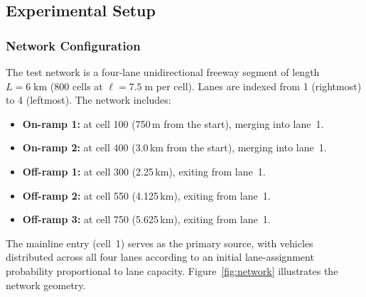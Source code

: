 \documentclass[review,authoryear]{elsarticle}
\begin{document}
\subsection{Experimental Setup}
\label{sec:exp_setup}

\subsubsection{Network Configuration}

The test network is a four-lane unidirectional freeway segment of length $L = 6\;\text{km}$ (800 cells at $\ell = 7.5\;\text{m}$ per cell). Lanes are indexed from 1 (rightmost) to 4 (leftmost). The network includes:
\begin{itemize}
    \item \textbf{On-ramp 1:} at cell 100 (750\,m from the start), merging into lane~1.
    \item \textbf{On-ramp 2:} at cell 400 (3.0\,km from the start), merging into lane~1.
    \item \textbf{Off-ramp 1:} at cell 300 (2.25\,km), exiting from lane~1.
    \item \textbf{Off-ramp 2:} at cell 550 (4.125\,km), exiting from lane~1.
    \item \textbf{Off-ramp 3:} at cell 750 (5.625\,km), exiting from lane~1.
\end{itemize}

The mainline entry (cell~1) serves as the primary source, with vehicles distributed across all four lanes according to an initial lane-assignment probability proportional to lane capacity. Figure~\ref{fig:network} illustrates the network geometry.
\end{document}
